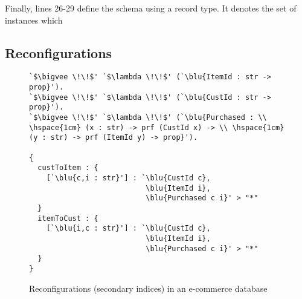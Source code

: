 \documentclass[sigplan,10pt,review,anonymous]{acmart}
\newcommand{\blu}[1]{\textbf{\color{blue}{#1}}}
\begin{document}
Finally, lines 26-29 define the schema using a record type. It denotes the set of instances which 


\subsection*{Reconfigurations}


\begin{figure} 

\begin{small}
\begin{lstlisting}[escapeinside=`']
`$\bigvee \!\!$' `$\lambda \!\!$' (`\blu{ItemId : str -> prop}').
`$\bigvee \!\!$' `$\lambda \!\!$' (`\blu{CustId : str -> prop}').
`$\bigvee \!\!$' `$\lambda \!\!$' (`\blu{Purchased : \\ \hspace{1cm} (x : str) -> prf (CustId x) -> \\ \hspace{1cm} (y : str) -> prf (ItemId y) -> prop}').

{ 
  custToItem : { 
    [`\blu{c,i : str}'] : `\blu{CustId c}, 
                           \blu{ItemId i}, 
                           \blu{Purchased c i}' > "*" 
  }
  itemToCust : { 
    [`\blu{i,c : str}'] : `\blu{CustId c}, 
                           \blu{ItemId i}, 
                           \blu{Purchased c i}' > "*"
  }
}
\end{lstlisting}

\end{small}
\caption{Reconfigurations (secondary indices) in an e-commerce database}
\label{fig:ecommerce-indices}
\end{figure}
\end{document}
